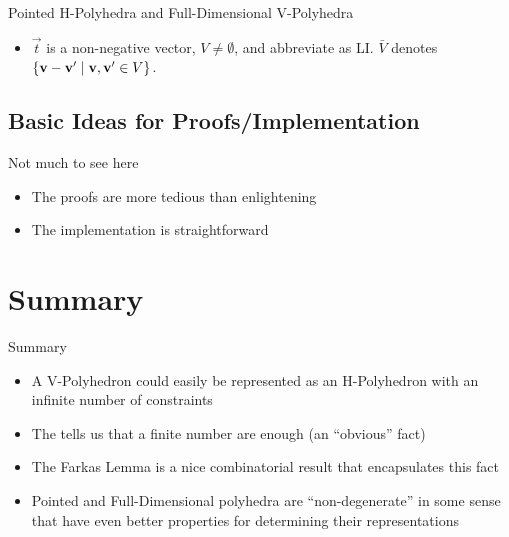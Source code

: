 \documentclass{beamer}
\begin{document}
\begin{frame}{Pointed H-Polyhedra and Full-Dimensional V-Polyhedra}
\begin{itemize}
  \item $\vec{t}$ is a non-negative vector, $V \neq \emptyset$, and abbreviate {\LI} as LI. $\bar V$ denotes $\{\mathbf{v}-\mathbf{v}'\;|\;\mathbf{v},\mathbf{v}'\in V\}$.\\

  \renewcommand{\arraystretch}{1.3}
\end{itemize}
\end{frame}

\subsection{Basic Ideas for Proofs/Implementation}

\begin{frame}{Not much to see here}
\begin{itemize}
  \item The proofs are more tedious than enlightening
  \item The implementation is straightforward
\end{itemize}
\end{frame}


\section*{Summary}

\begin{frame}{Summary}

	\begin{itemize}
		\item<1-> A V-Polyhedron could easily be represented as an H-Polyhedron with an infinite number of constraints
		\item<2-> The {\MWT} tells us that a finite number are enough (an ``obvious'' fact)
		\item<3-> The Farkas Lemma is a nice combinatorial result that encapsulates this fact
    \item<4-> Pointed and Full-Dimensional polyhedra are ``non-degenerate'' in some sense that have even better properties for determining their representations
	\end{itemize}
\end{frame}
\end{document}
